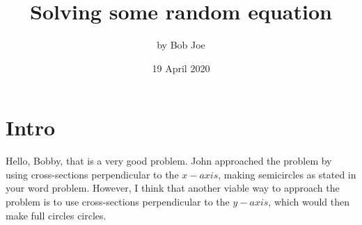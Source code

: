 \documentclass[letterpaper, 12pt]{article}
\begin{document}
\title{Solving some random equation}
\author{by Bob Joe}
\date{19 April 2020}
\maketitle

\section{Intro}
Hello, Bobby, that is a very good problem. John approached the problem by using cross-sections perpendicular to the $x-axis$, making semicircles as stated in your word problem. However, I think that another viable way to approach the problem is to use cross-sections perpendicular to the $y-axis$, which would then make full circles circles.

\end{document}
